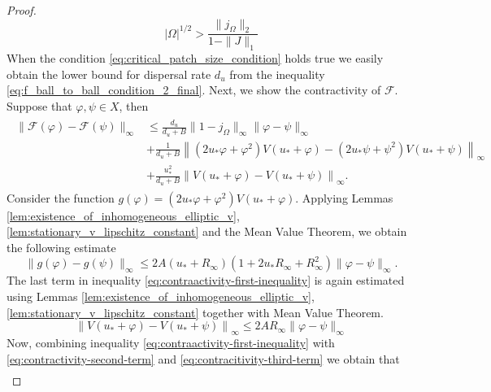\documentclass[12pt, a4paper]{article}
\theoremstyle{break}
\theoremstyle{break}
\theoremstyle{break}
\theoremstyle{break}
\theoremstyle{break}
\theoremstyle{break}
\theoremstyle{break}
\begin{document}
\begin{proof}
\begin{equation}
        \label{eq:critical_patch_size_condition}
        |\Omega|^{1/2} > \frac{\|j_\Omega\|_2}{1 - \|J\|_1}
    \end{equation}
    When the condition \eqref{eq:critical_patch_size_condition} holds true we easily obtain the lower bound for dispersal rate $d_u$ from the inequality \eqref{eq:f_ball_to_ball_condition_2_final}.
    Next, we show the contractivity of $\mathcal{F}$. Suppose that $\varphi, \psi \in X$, then
    \begin{align}
        \label{eq:contraactivity-first-inequality}
        \begin{split}
            \|\mathcal{F}(\varphi) - \mathcal{F}(\psi)\|_\infty
            &\leq
            \frac{d_u}{d_u + B} \|1 - j_\Omega\|_\infty \|\varphi - \psi\|_\infty \\
            &+ \frac{1}{d_u + B} \left\|(2u_* \varphi + \varphi^2) V(u_* + \varphi)
            - (2u_* \psi + \psi^2) V(u_* + \psi) \right\|_\infty \\
            &+ \frac{u_*^2}{d_u + B}\left\| V(u_* + \varphi) - V(u_* + \psi) \right\|_\infty.
        \end{split}
    \end{align}
    Consider the function $g(\varphi) = (2u_*\varphi + \varphi^2)V(u_* + \varphi)$. Applying Lemmas \ref{lem:existence_of_inhomogeneous_elliptic_v}, \ref{lem:stationary_v_lipschitz_constant} and the Mean Value Theorem, we obtain the following estimate 
    \begin{equation}
        \label{eq:contractivity-second-term}
        \|g(\varphi) - g(\psi)\|_\infty \leq 
        2A(u_* + R_\infty)
        \left( 1 + 2u_*R_\infty + R^2_\infty \right) \|\varphi - \psi\|_\infty.
    \end{equation}
    The last term in inequality \eqref{eq:contraactivity-first-inequality} is again estimated using Lemmas \ref{lem:existence_of_inhomogeneous_elliptic_v}, \ref{lem:stationary_v_lipschitz_constant} together with Mean Value Theorem. 
    \begin{equation}
        \label{eq:contracitivity-third-term}
        \left\| V(u_* + \varphi) - V(u_* + \psi) \right\|_\infty
        \leq
        2AR_\infty\|\varphi - \psi\|_\infty
    \end{equation}
    Now, combining inequality \eqref{eq:contraactivity-first-inequality} with \eqref{eq:contractivity-second-term} and \eqref{eq:contracitivity-third-term} we obtain that
    \begin{align}
        \label{eq:contractivity-final-inequality}

\end{align}
\end{proof}
\end{document}
